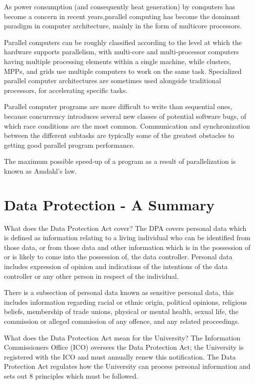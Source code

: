 \documentclass[12pt]{article}
\begin{document}
As power consumption (and consequently heat generation) by computers has become a concern in recent years,parallel computing has become the dominant paradigm in computer architecture, mainly in the form of multicore processors.

Parallel computers can be roughly classified according to the level at which the hardware supports parallelism, with multi-core and multi-processor computers having multiple processing elements within a single machine, while clusters, MPPs, and grids use multiple computers to work on the same task. Specialized parallel computer architectures are sometimes used alongside traditional processors, for accelerating specific tasks.

Parallel computer programs are more difficult to write than sequential ones, because concurrency introduces several new classes of potential software bugs, of which race conditions are the most common. Communication and synchronization between the different subtasks are typically some of the greatest obstacles to getting good parallel program performance.

The maximum possible speed-up of a program as a result of parallelization is known as Amdahl's law.

\section{Data Protection - A Summary}
What does the Data Protection Act cover?
The DPA covers personal data which is defined as information relating to a living individual who can be identified from those data, or from those data and other information which is in the possession of or is likely to come into the possession of, the data controller.  Personal data includes expression of opinion and indications of the intentions of the data controller or any other person in respect of the individual.

There is a subsection of personal data known as sensitive personal data, this includes information regarding racial or ethnic origin, political opinions, religious beliefs, membership of trade unions, physical or mental health, sexual life, the commission or alleged commission of any offence, and any related proceedings.

What does the Data Protection Act mean for the University?
The Information Commissioners Office (ICO) oversees the Data Protection Act; the University is registered with the ICO and must annually renew this notification.  The Data Protection Act regulates how the University can process personal information and sets out 8 principles which must be followed.
\end{document}
